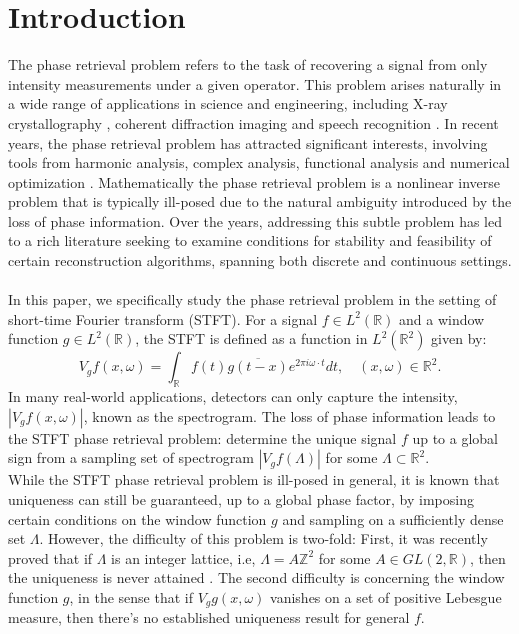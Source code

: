 \documentclass[graybox]{svmult}
\newcommand{\R}{\mathbb{R}}
\begin{document}
\section{Introduction}
\label{sec:1}
The phase retrieval problem refers to the task of recovering a signal from only intensity measurements under a given operator. This problem arises naturally in a wide range of applications in science and engineering, including X-ray crystallography \cite{millane1990phase}, coherent diffraction imaging \cite{walther1963question} and speech recognition \cite{picone1996fundamentals}. In recent years, the phase retrieval problem has attracted significant interests, involving tools from harmonic analysis, complex analysis, functional analysis and numerical optimization \cite{candes2015phase,alaifari2021phase,grohs2019stable}. Mathematically the phase retrieval problem is a nonlinear inverse problem that is typically ill-posed due to the natural ambiguity introduced by the loss of phase information. Over the years, addressing this subtle problem has led to a rich literature seeking to examine conditions for stability and feasibility of certain reconstruction algorithms, spanning both discrete and continuous settings.\\
\\
In this paper, we specifically study the phase retrieval problem in the setting of short-time Fourier transform (STFT). For a signal $f\in L^2(\R)$ and a window function $g\in L^2(\R)$, the STFT is defined as a function in $L^2(\R^2)$ given by:
$$V_gf(x,\omega) = \int_{\R} f(t)\overline{g(t-x)} e^{2\pi i \omega \cdot t}dt,  \quad (x, \omega) \in \R^2.$$
In many real-world applications, detectors can only capture the intensity, $|V_gf(x,\omega)|$, known as the spectrogram. The loss of phase information leads to the STFT phase retrieval problem: determine the unique signal $f$ up to a global sign from a sampling set of spectrogram $|V_gf(\Lambda)|$ for some $\Lambda \subset \R^{2}$.\\


While the STFT phase retrieval problem is ill-posed in general, it is known that uniqueness can still be guaranteed, up to a global phase factor, by imposing certain conditions on the window function $g$ and sampling on a sufficiently dense set $\Lambda$. However, the difficulty of this problem is two-fold: First, it was recently proved that if $\Lambda$ is an integer lattice, i.e, $\Lambda = A\mathbb{Z}^{2}$ for some $A \in GL(2,\R)$, then the uniqueness is never attained \cite{grohs2023injectivity}. 
The second difficulty is concerning the window function $g$, in the sense that if $V_gg(x,\omega)$ vanishes on a set of positive Lebesgue measure, then there's no established uniqueness result for general $f$.\\
\end{document}
